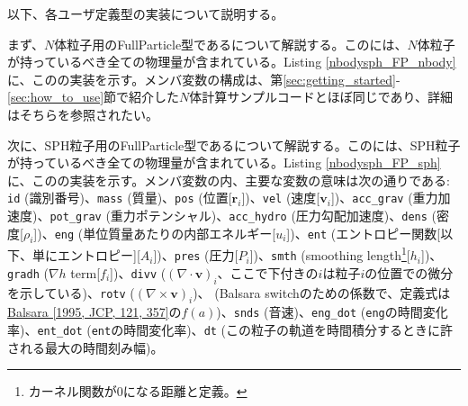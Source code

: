 以下、各ユーザ定義型の実装について説明する。

まず、$N$体粒子用のFullParticle型であるについて解説する。この\structure には、$N$体粒子が持っているべき全ての物理量が含まれている。Listing \ref{nbodysph_FP_nbody}に、この\structure の実装を示す。メンバ変数の構成は、第\ref{sec:getting_started}-\ref{sec:how_to_use}節で紹介した$N$体計算サンプルコードとほぼ同じであり、詳細はそちらを参照されたい。

\ifCpp %

\endifCpp
\ifFtn %

\endifFtn
\ifC %

\endifC


次に、SPH粒子用のFullParticle型であるについて解説する。この\structure には、SPH粒子が持っているべき全ての物理量が含まれている。Listing \ref{nbodysph_FP_sph}に、この\structure の実装を示す。メンバ変数の内、主要な変数の意味は次の通りである: \texttt{id} (識別番号)、\texttt{mass} (質量)、\texttt{pos} (位置[$\bm{r}_{i}$])、\texttt{vel} (速度[$\bm{v}_{i}$])、\texttt{acc\_grav} (重力加速度)、\texttt{pot\_grav} (重力ポテンシャル)、\texttt{acc\_hydro} (圧力勾配加速度)、\texttt{dens} (密度[$\rho_{i}$])、\texttt{eng} (単位質量あたりの内部エネルギー[$u_{i}$])、\texttt{ent} (エントロピー関数[以下、単にエントロピー][$A_{i}$])、\texttt{pres} (圧力[$P_{i}$])、\texttt{smth} (smoothing length\footnote{カーネル関数が0になる距離と定義。}[$h_{i}$])、\texttt{gradh} ($\nabla h$ term[$f_{i}$])、\texttt{divv} ($(\nabla\cdot\bm{v})_{i}$、ここで下付きの$i$は粒子$i$の位置での微分を示している)、\texttt{rotv} ($(\nabla\times\bm{v})_{i}$)、 (Balsara switchのための係数で、定義式は\href{https://doi.org/10.1016/S0021-9991(95)90221-X}{Balsara [1995, JCP, 121, 357]}の$f(a)$)、\texttt{snds} (音速)、\texttt{eng\_dot} (\texttt{eng}の時間変化率)、\texttt{ent\_dot} (\texttt{ent}の時間変化率)、\texttt{dt} (この粒子の軌道を時間積分するときに許される最大の時間刻み幅)。

